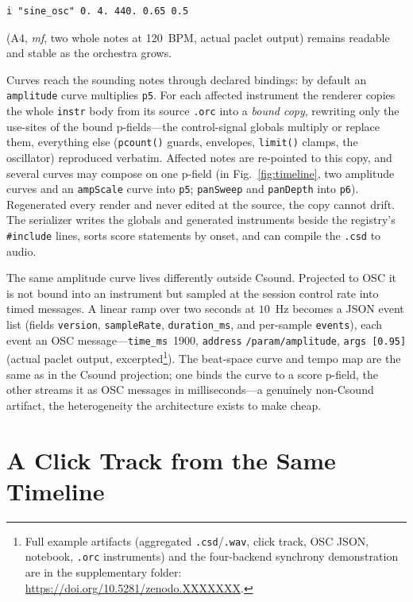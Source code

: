 \documentclass[runningheads,a4paper]{llncs}
\newcommand{\supplementaryurl}{https://doi.org/10.5281/zenodo.XXXXXXX}
\begin{document}
{\small\begin{verbatim}
i "sine_osc" 0. 4. 440. 0.65 0.5
\end{verbatim}}

\noindent
(A4, \emph{mf}, two whole notes at 120~BPM, actual paclet output) remains
readable and stable as the orchestra grows.

Curves reach the sounding notes through declared bindings: by default an
\texttt{amplitude} curve multiplies \texttt{p5}. For each affected instrument
the renderer copies the whole \texttt{instr} body from its source \texttt{.orc}
into a \emph{bound copy}, rewriting only the use-sites of the bound
p-fields---the control-signal globals multiply or replace them, everything else
(\texttt{pcount()} guards, envelopes, \texttt{limit()} clamps, the oscillator)
reproduced verbatim. Affected notes are re-pointed to this copy, and several
curves may compose on one p-field (in Fig.~\ref{fig:timeline}, two amplitude
curves and an \texttt{ampScale} curve into \texttt{p5}; \texttt{panSweep} and
\texttt{panDepth} into \texttt{p6}). Regenerated every render and never edited
at the source, the copy cannot drift. The serializer writes the globals and
generated instruments beside the registry's \texttt{\#include} lines, sorts
score statements by onset, and can compile the \texttt{.csd} to audio.

The same amplitude curve lives differently outside Csound. Projected to OSC it
is not bound into an instrument but sampled at the session control rate into
timed messages. A linear ramp over two seconds at $10$~Hz becomes a JSON event
list (fields \texttt{version}, \texttt{sampleRate}, \texttt{duration\_ms}, and
per-sample \texttt{events}), each event an OSC message---\texttt{time\_ms}~1900,
\texttt{address} \texttt{/param/amplitude}, \texttt{args}~\texttt{[0.95]}
(actual paclet output, excerpted\footnote{Full example artifacts (aggregated
\texttt{.csd}/\texttt{.wav}, click track, OSC JSON, notebook, \texttt{.orc}
instruments) and the four-backend synchrony demonstration are in the
supplementary folder: \url{\supplementaryurl}.}). The beat-space curve and tempo
map are the same as in the Csound projection; one binds the curve to a score
p-field, the other streams it as OSC messages in milliseconds---a genuinely
non-Csound artifact, the heterogeneity the architecture exists to make cheap.

\section{A Click Track from the Same Timeline}\label{sec:click}
\end{document}
